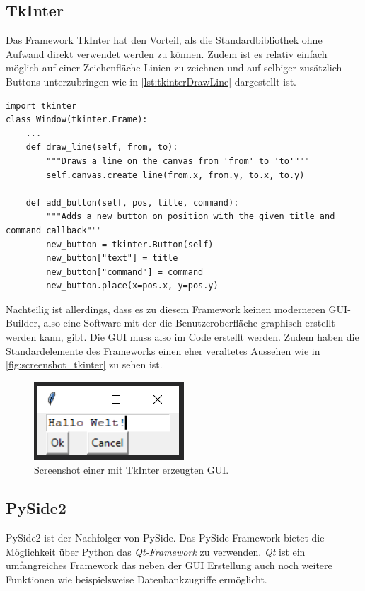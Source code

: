 \subsection{TkInter}
Das Framework TkInter hat den Vorteil, als die Standardbibliothek ohne Aufwand direkt verwendet werden zu können. Zudem ist es relativ einfach möglich auf einer Zeichenfläche Linien zu zeichnen und auf selbiger zusätzlich Buttons unterzubringen wie in \autoref{lst:tkinterDrawLine} dargestellt ist.
\begin{lstlisting}[caption={Zeichnen von Linien und Buttons mit TkInter},label=lst:tkinterDrawLine]
import tkinter
class Window(tkinter.Frame):
	...
	def draw_line(self, from, to):
		"""Draws a line on the canvas from 'from' to 'to'"""
		self.canvas.create_line(from.x, from.y, to.x, to.y)
	
	def add_button(self, pos, title, command):
		"""Adds a new button on position with the given title and command callback"""
		new_button = tkinter.Button(self)
		new_button["text"] = title
		new_button["command"] = command
		new_button.place(x=pos.x, y=pos.y)
\end{lstlisting}

Nachteilig ist allerdings, dass es zu diesem Framework keinen moderneren \ac{GUI}-Builder, also eine Software mit der die Benutzeroberfläche graphisch erstellt werden kann, gibt. Die \ac{GUI} muss also im Code erstellt werden. Zudem haben die Standardelemente des Frameworks einen eher veraltetes Aussehen wie in \autoref{fig:screenshot_tkinter} zu sehen ist.

\begin{figure}[h]
\begin{center}
\includegraphics[scale=0.7]{images/tkinter_screenshot.png}
\caption{Screenshot einer mit TkInter erzeugten GUI.}
\label{fig:screenshot_tkinter}
\end{center}
\end{figure}

\subsection{PySide2}
PySide2 ist der Nachfolger von PySide. Das PySide-Framework bietet die Möglichkeit über Python das \textit{Qt-Framework} zu verwenden. \textit{Qt} ist ein umfangreiches Framework das neben der \ac{GUI} Erstellung auch noch weitere Funktionen wie beispielsweise Datenbankzugriffe ermöglicht.

